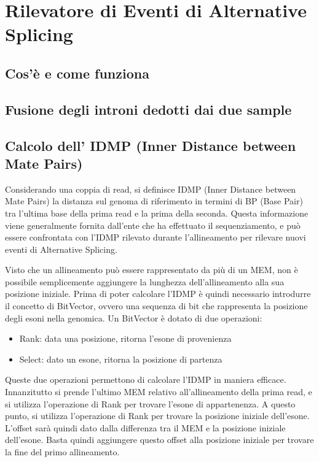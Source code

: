 \section{Rilevatore di Eventi di Alternative Splicing}

\subsection{Cos'è e come funziona}

\newpage

\subsection{Fusione degli introni dedotti dai due sample}

\newpage

\subsection{Calcolo dell' IDMP (Inner Distance between Mate Pairs)}
Considerando una coppia di read, si definisce IDMP (Inner Distance between Mate Pairs) la distanza sul genoma di riferimento in termini di BP (Base Pair) tra l'ultima base della prima read e la prima della seconda. Questa informazione viene generalmente fornita dall'ente che ha effettuato il sequenziamento, e può essere confrontata con l'IDMP rilevato durante l'allineamento per rilevare nuovi eventi di Alternative Splicing.

Visto che un allineamento può essere rappresentato da più di un MEM, non è possibile semplicemente aggiungere la lunghezza dell'allineamento alla sua posizione iniziale. Prima di poter calcolare l'IDMP è quindi necessario introdurre il concetto di BitVector, ovvero una sequenza di bit che rappresenta la posizione degli esoni nella genomica. Un BitVector è dotato di due operazioni:

\begin{itemize}
	\item Rank: data una posizione, ritorna l'esone di provenienza
	\item Select: dato un esone, ritorna la posizione di partenza 
\end{itemize}

Queste due operazioni permettono di calcolare l'IDMP in maniera efficace. Innanzitutto si prende l'ultimo MEM relativo all'allineamento della prima read, e si utilizza l'operazione di Rank per trovare l'esone di appartenenza. A questo punto, si utilizza l'operazione di Rank per trovare la posizione iniziale dell'esone. L'offset sarà quindi dato dalla differenza tra il MEM e la posizione iniziale dell'esone. Basta quindi aggiungere questo offset alla posizione iniziale per trovare la fine del primo allineamento.

